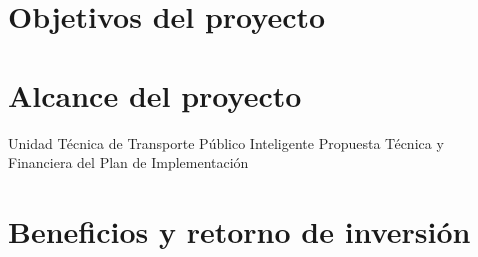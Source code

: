 \documentclass{report}
\begin{document}
\section{Objetivos del proyecto}

\section{Alcance del proyecto}

Unidad Técnica de Transporte Público Inteligente
Propuesta Técnica y Financiera del Plan de Implementación

\section{Beneficios y retorno de inversión}
\end{document}
